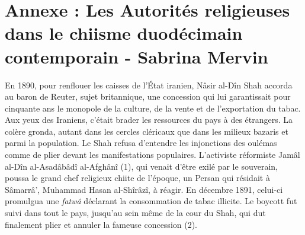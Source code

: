 
\hypertarget{sabrina-mervin}{%
\section{Annexe : Les Autorités religieuses dans le chiisme duodécimain
contemporain - Sabrina Mervin}\label{sabrina-mervin}}




 

En 1890, pour renflouer les caisses de l'État iranien, Nâsir al-Dîn Shah
accorda au baron de Reuter, sujet britannique, une concession qui lui
garantissait pour cinquante ans le monopole de la culture, de la vente
et de l'exportation du tabac. Aux yeux des Iraniens, c'était brader les
ressources du pays à des étrangers. La colère gronda, autant dans les
cercles cléricaux que dans les milieux bazaris et parmi la population.
Le Shah refusa d'entendre les injonctions des oulémas comme de plier
devant les manifestations populaires. L'activiste réformiste Jamâl
al-Dîn al-Asadâbâdî al-Afghânî (1), qui venait d'être exilé par le
souverain, poussa le grand chef religieux chiite de l'époque, un Persan
qui résidait à Sâmarrâ', Muhammad Hasan al-Shîrâzî, à réagir. En
décembre 1891, celui-ci promulgua une \emph{fatwâ} déclarant la
consommation de tabac illicite. Le boycott fut suivi dans tout le pays,
jusqu'au sein même de la cour du Shah, qui dut finalement plier et
annuler la fameuse concession (2).

